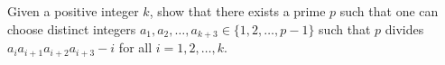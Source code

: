 Given a positive integer $k$, show that there exists a prime $p$ such that one can choose distinct integers $a_1, a_2, \ldots, a_{k+3} \in \{1, 2, \ldots, p-1\}$ such that $p$ divides $a_i a_{i+1} a_{i+2} a_{i+3} - i$ for all $i = 1, 2, \ldots, k$.
